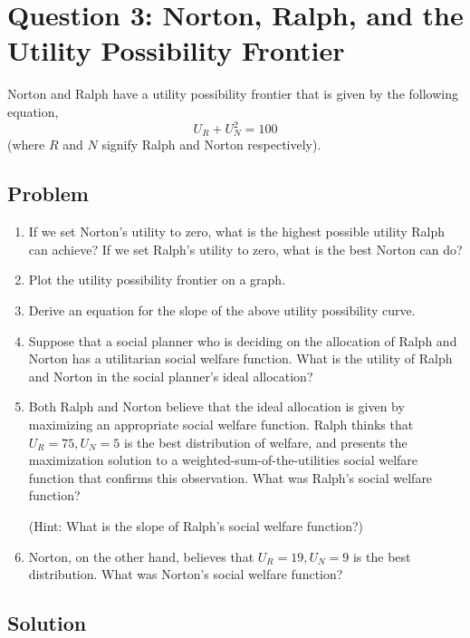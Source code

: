 \documentclass[12pt]{article}
\begin{document}
\newpage
\section{Question 3: Norton, Ralph, and the Utility Possibility Frontier}

\noindent
Norton and Ralph have a utility possibility frontier that is given by the following equation,
\[
U_R + U_N^2 = 100
\]
(where $R$ and $N$ signify Ralph and Norton respectively).

\subsection{Problem}
\begin{enumerate}[label=(\alph*)]
    \item If we set Norton's utility to zero, what is the highest possible utility Ralph can achieve? If we set Ralph's utility to zero, what is the best Norton can do?
    \item Plot the utility possibility frontier on a graph.
    \item Derive an equation for the slope of the above utility possibility curve.
    \item Suppose that a social planner who is deciding on the allocation of Ralph and Norton has a utilitarian social welfare function. What is the utility of Ralph and Norton in the social planner's ideal allocation?
    \item Both Ralph and Norton believe that the ideal allocation is given by maximizing an appropriate social welfare function. Ralph thinks that $U_R=75,U_N=5$ is the best distribution of welfare, and presents the maximization solution to a weighted-sum-of-the-utilities social welfare function that confirms this observation. What was Ralph's social welfare function?

    (Hint: What is the slope of Ralph's social welfare function?)
    \item Norton, on the other hand, believes that $U_R=19,U_N=9$ is the best distribution. What was Norton's social welfare function?
\end{enumerate}

\newpage
\subsection{Solution}
\end{document}
